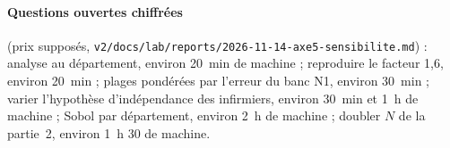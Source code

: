 \paragraph{Questions ouvertes chiffrées} (prix supposés\suppose{}, \texttt{v2/docs/lab/reports/2026-11-14-axe5-sensibilite.md}) :
analyse au département, environ 20~min de machine ; reproduire le facteur 1,6, environ 20~min ; plages pondérées par
l'erreur du banc N1, environ 30~min ; varier l'hypothèse d'indépendance des infirmiers, environ 30~min et 1~h de
machine ; Sobol par département, environ 2~h de machine ; doubler $N$ de la partie~2, environ 1~h 30 de machine.
\endgroup
